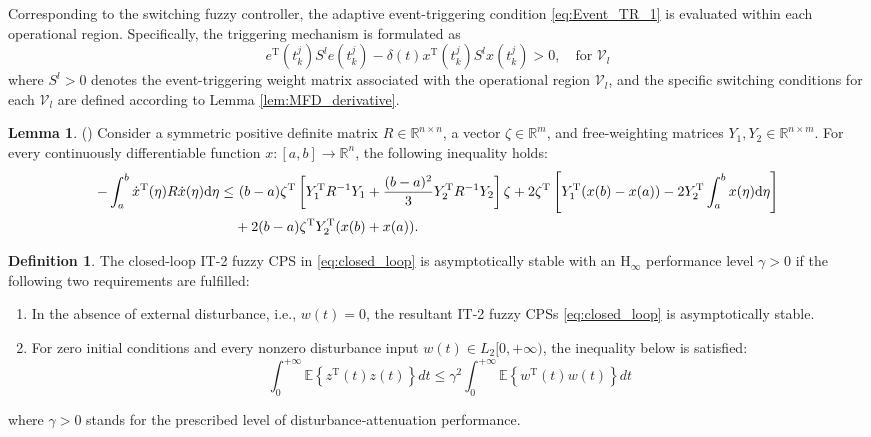 \documentclass[preprint,review,fleqn,sort&compress,3p]{elsarticle}
\theoremstyle{definition} %
\theoremstyle{definition}%
\newtheorem{Lem}{Lemma}[section]
\newtheorem{Def}{Definition}[section]
\begin{document}
Corresponding to the switching fuzzy controller, the adaptive event-triggering condition \eqref{eq:Event_TR_1} is evaluated within each operational region. Specifically, the triggering mechanism is formulated as
\begin{equation} 
 e^{\mathrm{T}}(t^j_{k}) S^l e(t^j_{k}) - \delta(t) x^{\mathrm{T}}(t_{k}^j) S^l x(t_{k}^j) > 0, \quad \text{for } \mathcal{V}_l
\end{equation}
where $S^l>0$ denotes the event-triggering weight matrix associated with the operational region $\mathcal{V}_l$, and the specific switching conditions for each $\mathcal{V}_l$ are defined according to Lemma \ref{lem:MFD_derivative}.

\begin{Lem}\label{lem2}(\cite{guanModifiedLoopedFunctional2021a}) 
Consider a symmetric positive definite matrix $R \in \mathbb{R}^{n\times n}$, a vector $\zeta \in \mathbb{R}^{m}$, and free-weighting matrices $Y_1, Y_2 \in \mathbb{R}^{n\times m}$. For every continuously differentiable function $x : [a,b] \rightarrow \mathbb{R}^{n}$, the following inequality holds:
\begin{align}
	-\int_{a}^{b} \dot{x}^{\mathrm{T}}(\eta) R \dot{x}(\eta) \mathrm{d}\eta 
	\le & \ (b-a) \zeta^{\mathrm{T}} \left[ Y_1^{\mathrm{T}} R^{-1} Y_1 
	+ \frac{(b-a)^2}{3} Y_2^{\mathrm{T}} R^{-1} Y_2 \right] \zeta 
	 + 2\zeta^{\mathrm{T}} \left[ Y_1^{\mathrm{T}} (x(b) - x(a)) 
	 - 2Y_2^{\mathrm{T}} \int_{a}^{b} x(\eta)\mathrm{d}\eta \right] \notag \\
	& + 2(b-a) \zeta^{\mathrm{T}} Y_2^{\mathrm{T}} (x(b) + x(a)).
\end{align}
\end{Lem} 

\begin{Def}\label{Def1}
	The closed-loop IT-2 fuzzy CPS in \eqref{eq:closed_loop} is asymptotically stable with an $\mathrm{H}_\infty$ performance level $\gamma>0$ if the following two requirements are fulfilled:
	
	\begin{enumerate}
		\item In the absence of external disturbance, i.e., $w(t)=0$, the resultant IT-2 fuzzy CPSs \eqref{eq:closed_loop} is asymptotically stable.
		
		\item For zero initial conditions and every nonzero disturbance input $w(t)\in L_2[0,+\infty)$, the inequality below is satisfied:
		\begin{equation}
			\int_0^{+\infty}
			\mathbb E\left\{
			z^\mathrm{T}(t)z(t)
			\right\}dt
			\le
			\gamma^2
			\int_0^{+\infty}
			\mathbb E\left\{
			w^\mathrm{T}(t)w(t)
			\right\}dt
		\end{equation}
	\end{enumerate}
	where $\gamma>0$ stands for the prescribed level of disturbance‑attenuation performance.

\end{Def}
\end{document}
